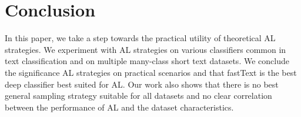 \section{Conclusion}
\label{sec:conclude}
In this paper, we take a step towards the practical utility of theoretical 
AL strategies. We experiment with AL strategies on various classifiers 
common in text classification and on multiple many-class short text datasets. 
We conclude the significance AL strategies on practical scenarios and 
that fastText is the best deep classifier best suited for AL.
Our work also shows that there is no best general sampling strategy 
suitable for all datasets and no clear correlation 
between the performance of AL and the dataset characteristics.
